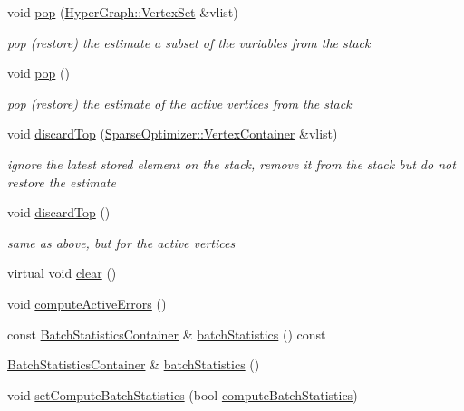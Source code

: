 \begin{DoxyCompactItemize}
void \hyperlink{classg2o_1_1SparseOptimizer_aa6688f8636bf89ef919d72947692d59c}{pop} (\hyperlink{classg2o_1_1HyperGraph_a703938cdb4bb636860eed55a2489d70c}{Hyper\+Graph\+::\+Vertex\+Set} \&vlist)
\begin{DoxyCompactList}\small\item\em pop (restore) the estimate a subset of the variables from the stack \end{DoxyCompactList}\item 
void \hyperlink{classg2o_1_1SparseOptimizer_ad2f7f62ebe17b40e050f0525db64355b}{pop} ()
\begin{DoxyCompactList}\small\item\em pop (restore) the estimate of the active vertices from the stack \end{DoxyCompactList}\item 
void \hyperlink{classg2o_1_1SparseOptimizer_ac6344493dc9f66d5443759ff9f2abf6c}{discard\+Top} (\hyperlink{classg2o_1_1HyperGraph_a9339534c99300a0ddac87ba976ef188c}{Sparse\+Optimizer\+::\+Vertex\+Container} \&vlist)
\begin{DoxyCompactList}\small\item\em ignore the latest stored element on the stack, remove it from the stack but do not restore the estimate \end{DoxyCompactList}\item 
void \hyperlink{classg2o_1_1SparseOptimizer_a20ed9e9f1201bfb874456a8d30f169fb}{discard\+Top} ()
\begin{DoxyCompactList}\small\item\em same as above, but for the active vertices \end{DoxyCompactList}\item 
virtual void \hyperlink{classg2o_1_1SparseOptimizer_a4881e4ac9ba9a58d4e249dc03ef9683d}{clear} ()
\item 
void \hyperlink{classg2o_1_1SparseOptimizer_a09572668aa85b75a5bebf7b66401ce8f}{compute\+Active\+Errors} ()
\item 
const \hyperlink{namespaceg2o_a526b32fde21f83173acb2bb29db68275}{Batch\+Statistics\+Container} \& \hyperlink{classg2o_1_1SparseOptimizer_ac0b9e0f3c9d05f600882b9c9b8a5c7c1}{batch\+Statistics} () const 
\item 
\hyperlink{namespaceg2o_a526b32fde21f83173acb2bb29db68275}{Batch\+Statistics\+Container} \& \hyperlink{classg2o_1_1SparseOptimizer_aa93ecf8d3b99e2eef3709a5c70cc8632}{batch\+Statistics} ()
\item 
void \hyperlink{classg2o_1_1SparseOptimizer_a775fe12d7df941acbbd86bcf838f0f3c}{set\+Compute\+Batch\+Statistics} (bool \hyperlink{classg2o_1_1SparseOptimizer_a4a4261f1008f1b0f660381b9c46b78f7}{compute\+Batch\+Statistics})

\end{DoxyCompactItemize}

